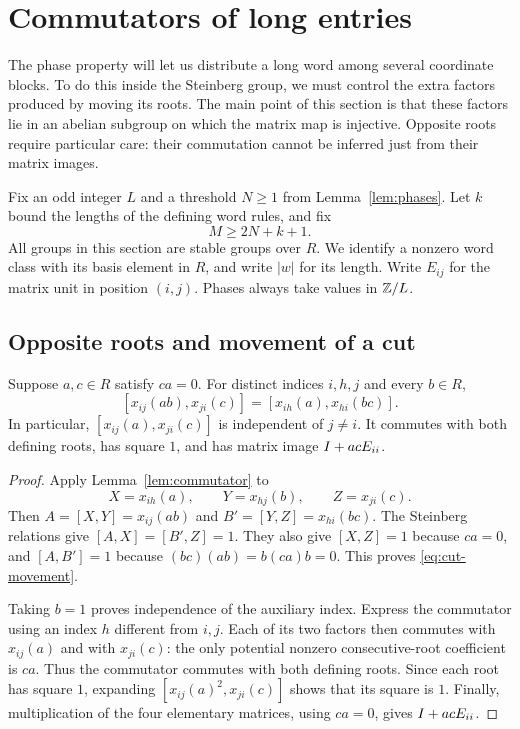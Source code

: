 \section{Commutators of long entries}\label{sec:long-entries}

The phase property will let us distribute a long word among several
coordinate blocks. To do this inside the Steinberg group, we must control
the extra factors produced by moving its roots. The main point of this
section is that these factors lie in an abelian subgroup on which the
matrix map is injective. Opposite roots require particular care: their
commutation cannot be inferred just from their matrix images.

Fix an odd integer $L$ and a threshold $N\ge1$ from
Lemma~\ref{lem:phases}. Let $k$ bound the lengths of the defining word
rules, and fix
\begin{equation}\label{eq:long-threshold}
 M\ge 2N+k+1.
\end{equation}
All groups in this section are stable groups over $R$. We identify a
nonzero word class with its basis element in $R$, and write $|w|$ for its
length. Write $E_{ij}$ for the matrix unit in position $(i,j)$.
Phases always take values in $\mathbb Z/L$.

\subsection{Opposite roots and movement of a cut}

\begin{lemma}\label{lem:opposite}
Suppose $a,c\in R$ satisfy $ca=0$. For distinct indices $i,h,j$ and
every $b\in R$,
\begin{equation}\label{eq:cut-movement}
 [x_{ij}(ab),x_{ji}(c)]
   =[x_{ih}(a),x_{hi}(bc)].
\end{equation}
In particular, $[x_{ij}(a),x_{ji}(c)]$ is independent of $j\ne i$.
It commutes with both defining roots, has square $1$, and has matrix
image $I+acE_{ii}$.
\end{lemma}

\begin{proof}
Apply Lemma~\ref{lem:commutator} to
\[
 X=x_{ih}(a),\qquad Y=x_{hj}(b),\qquad Z=x_{ji}(c).
\]
Then $A=[X,Y]=x_{ij}(ab)$ and $B'=[Y,Z]=x_{hi}(bc)$.
The Steinberg relations give $[A,X]=[B',Z]=1$.
They also give $[X,Z]=1$ because $ca=0$, and $[A,B']=1$
because $(bc)(ab)=b(ca)b=0$. This proves
\eqref{eq:cut-movement}.

Taking $b=1$ proves independence of the auxiliary index. Express the
commutator using an index $h$ different from $i,j$. Each of its two
factors then commutes with $x_{ij}(a)$ and with $x_{ji}(c)$: the only
potential nonzero consecutive-root coefficient is $ca$. Thus the
commutator commutes with both defining roots. Since each root has
square $1$, expanding $[x_{ij}(a)^2,x_{ji}(c)]$ shows
that its square is $1$. Finally, multiplication of the four elementary
matrices, using $ca=0$, gives $I+acE_{ii}$.
\end{proof}

